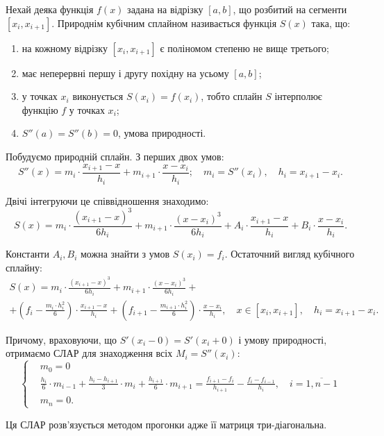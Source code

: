 Нехай деяка функція $f(x)$ задана на відрізку $[a, b]$, що розбитий на сегменти $[x_i, x_{i + 1}]$. Природнім кубічним сплайном називається функція $S(x)$ така, що:
\begin{enumerate}
    \item на кожному відрізку $[x_i, x_{i + 1}]$ є поліномом степеню не вище третього;
    \item має неперервні першу і другу похідну на усьому $[a, b]$;
    \item у точках $x_i$ виконується $S(x_i) = f(x_i)$, тобто сплайн $S$ інтерполює функцію $f$ у точках $x_i$;
    \item $S''(a) = S''(b) = 0$, умова природності.
\end{enumerate}

Побудуємо природній сплайн. З перших двох умов: \[ S''(x) = m_i \cdot \frac{x_{i + 1} - x}{h_i} + m_{i + 1} \cdot \frac{x - x_i}{h_i}; \quad m_i = S''(x_i), \quad h_i = x_{i + 1} - x_i. \] 

Двічі інтегруючи це співвідношення знаходимо: \[ S(x) = m_i \cdot \frac{(x_{i + 1} - x)^3}{6 h_i} + m_{i + 1} \cdot \frac{(x - x_i)^3}{6 h_i} + A_i \cdot \frac{x_{i + 1} - x}{h_i} + B_i \cdot \frac{x - x_i}{h_i}. \] 

Константи $A_i, B_i$ можна знайти з умов $S(x_i) = f_i$. Остаточний вигляд кубічного сплайну: \begin{multline*} S(x) = m_i \cdot \frac{(x_{i + 1} - x)^3}{6 h_i} + m_{i + 1} \cdot \frac{(x - x_i)^3}{6 h_i} + \\ + \left( f_i - \frac{m_i \cdot h_i^2}{6} \right) \cdot \frac{x_{i + 1} - x}{h_i} + \left( f_{i + 1} - \frac{m_{i + 1} \cdot h_i^2}{6}\right) \cdot \frac{x - x_i}{h_i}, \quad x \in [x_i, x_{i + 1}], \quad h_i = x_{i + 1} - x_i. \end{multline*}

Причому, враховуючи, що $S'(x_i - 0) = S'(x_i + 0)$ і умову природності, отримаємо СЛАР для знаходження всіх $M_i = S''(x_i)$: \[ \left\{ \begin{aligned} & m_0 = 0 \\ & \frac{h_i}{6} \cdot m_{i -1 } + \frac{h_i - h_{i + 1}}{3} \cdot m_i + \frac{h_{i + 1}}{6} \cdot m_{i + 1} = \frac{f_{i + 1} - f_i}{h_{i + 1}} - \frac{f_i - f_{i - 1}}{h_i}, \quad i = \overline{1, n - 1} \\ & m_n = 0. \end{aligned} \right. \]

Ця СЛАР розв'язується методом прогонки адже її матриця три-діагональна.

